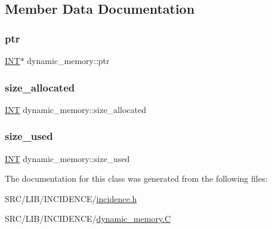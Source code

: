 \subsection{Member Data Documentation}
\mbox{\label{classdynamic__memory_ad19e5901bd3964390110632bda51e5d4}} 
\subsubsection{\texorpdfstring{ptr}{ptr}}
{\footnotesize\ttfamily \mbox{\hyperlink{galois_8h_a09fddde158a3a20bd2dcadb609de11dc}{I\+NT}}$\ast$ dynamic\+\_\+memory\+::ptr}

\mbox{\label{classdynamic__memory_a778cf51a23b12b3036c00ddf6248ca82}} 
\subsubsection{\texorpdfstring{size\+\_\+allocated}{size\_allocated}}
{\footnotesize\ttfamily \mbox{\hyperlink{galois_8h_a09fddde158a3a20bd2dcadb609de11dc}{I\+NT}} dynamic\+\_\+memory\+::size\+\_\+allocated}

\mbox{\label{classdynamic__memory_ad5509ddef531dd418419274d5b8f7a59}} 
\subsubsection{\texorpdfstring{size\+\_\+used}{size\_used}}
{\footnotesize\ttfamily \mbox{\hyperlink{galois_8h_a09fddde158a3a20bd2dcadb609de11dc}{I\+NT}} dynamic\+\_\+memory\+::size\+\_\+used}



The documentation for this class was generated from the following files\+:\begin{DoxyCompactItemize}
\item 
S\+R\+C/\+L\+I\+B/\+I\+N\+C\+I\+D\+E\+N\+C\+E/\mbox{\hyperlink{incidence_8h}{incidence.\+h}}\item 
S\+R\+C/\+L\+I\+B/\+I\+N\+C\+I\+D\+E\+N\+C\+E/\mbox{\hyperlink{dynamic__memory_8_c}{dynamic\+\_\+memory.\+C}}\end{DoxyCompactItemize}

